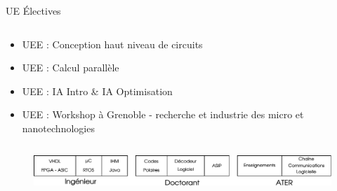 \documentclass[t,compress,mathserif,12pt,xcolor=dvipsnames]{beamer}
\begin{document}
\begin{frame}[t]{UE \'Electives}
  \begin{minipage}[t][5.0cm][t]{\textwidth}
    \begin{columns}
      \begin{column}{0.63\textwidth}
        \vspace{-30pt}
        \begin{itemize}
            \item UEE : Conception haut niveau de circuits
            \item UEE : Calcul parallèle
            \item UEE : IA Intro \& IA Optimisation
            \item UEE : Workshop à Grenoble - recherche et industrie des micro et nanotechnologies
        \end{itemize}
      \end{column}
      \begin{column}{0.04\textwidth}

      \end{column}
      \begin{column}{0.33\textwidth}
      \end{column}
    \end{columns}
  \end{minipage}
  \begin{figure}[htp]
    \centering
    \includegraphics[width=\textwidth]{fig/frise}
  \end{figure}



\end{frame}
\end{document}
